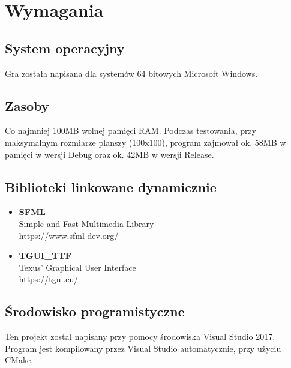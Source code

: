\documentclass[12pt,a4paper]{article}
\begin{document}
\newpage

\section{Wymagania}
\subsection{System operacyjny}
Gra została napisana dla systemów 64 bitowych Microsoft Windows.

\subsection{Zasoby}
Co najmniej 100MB wolnej pamięci RAM. Podczas testowania, przy maksymalnym rozmiarze planszy (100x100), program zajmował ok. 58MB w pamięci w wersji Debug oraz ok. 42MB w wersji Release.

\subsection{Biblioteki linkowane dynamicznie}
\begin{itemize}
\item \Large \textbf{SFML}\\
Simple and Fast Multimedia Library\\
\url{https://www.sfml-dev.org/}
\item \Large \textbf{TGUI\_TTF}\\
Texus' Graphical User Interface\\
\url{https://tgui.eu/}
\end{itemize}

\subsection{Środowisko programistyczne}
Ten projekt został napisany przy pomocy środowiska Visual Studio 2017.
Program jest kompilowany przez Visual Studio automatycznie, przy użyciu CMake.
\end{document}
